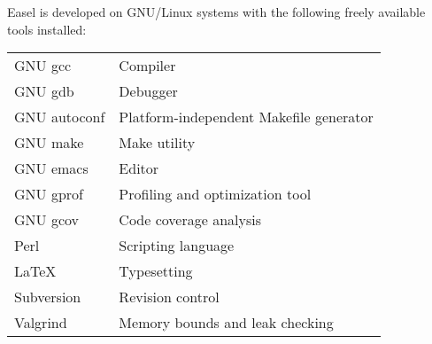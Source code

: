 Easel is developed on GNU/Linux systems with the following freely
available tools installed:

{\small
\begin{tabular}{ll}
GNU gcc         & Compiler \\
GNU gdb         & Debugger\\
GNU autoconf    & Platform-independent Makefile generator\\
GNU make        & Make utility\\
GNU emacs       & Editor    \\
GNU gprof       & Profiling and optimization tool \\
GNU gcov        & Code coverage analysis\\
Perl            & Scripting language\\
LaTeX           & Typesetting\\
Subversion      & Revision control\\
Valgrind        & Memory bounds and leak checking\\
\end{tabular}
}



